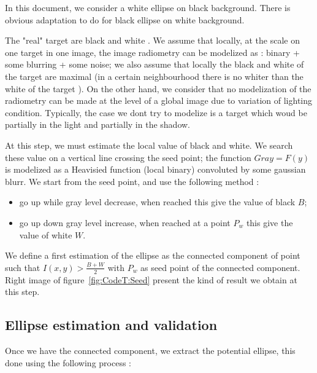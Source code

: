 In this document, we consider a white ellipse  on black background.  There is obvious
adaptation to do for black ellipse on white background.

The "real" target are black and white . We assume that locally, at the scale on one target in
one image, the image radiometry can be modelized as :  binary + some blurring + some  noise;
we also assume that locally the black and white of the target are maximal  (in a certain
neighbourhood there is no whiter than the white of the target ).
On the other hand, we consider that no  modelization of the radiometry can be made
at the level of a global image due to variation of lighting condition. Typically, 
the case we dont try to modelize is a target which woud be partially in the light and partially
in the shadow.

At this step, we must estimate the local value of black and white.  We search these
value on a vertical line crossing the seed point;  the function $Gray=F(y)$ is modelized
as a  Heavisied function (local binary) convoluted by  some gaussian blurr.
We start from the seed point, and use the following method :

\begin{itemize}
   \item  go up while gray level decrease, when reached this give the value of black $B$; 
   \item  go up down gray level increase, when reached  at a point $P_w$ this give the value of white $W$.
\end{itemize}

We define a first estimation of the ellipse as the connected component of point  such
that $I(x,y) >  \frac{B+W}{2}$ with $P_w$ as seed point of the connected component.
Right image of figure~\ref{fig:CodeT:Seed} present the kind of result we obtain at this step.


\subsection{Ellipse estimation and validation}

Once we have the connected component, we extract the potential ellipse,
this done using the following process :

